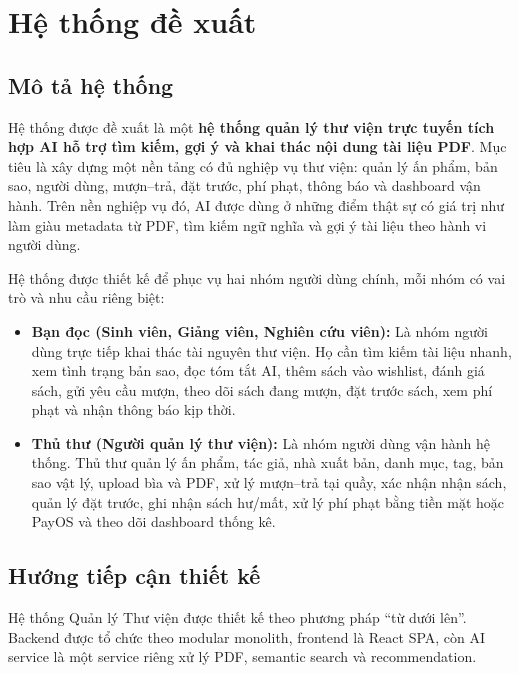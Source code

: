 \chapter{Hệ thống đề xuất}
\label{chap:HeThongDeXuat}

\section{Mô tả hệ thống}
\label{sec:MoTaHeThong}

Hệ thống được đề xuất là một \textbf{hệ thống quản lý thư viện trực tuyến tích hợp AI hỗ trợ tìm kiếm, gợi ý và khai thác nội dung tài liệu PDF}. Mục tiêu là xây dựng một nền tảng có đủ nghiệp vụ thư viện: quản lý ấn phẩm, bản sao, người dùng, mượn--trả, đặt trước, phí phạt, thông báo và dashboard vận hành. Trên nền nghiệp vụ đó, AI được dùng ở những điểm thật sự có giá trị như làm giàu metadata từ PDF, tìm kiếm ngữ nghĩa và gợi ý tài liệu theo hành vi người dùng.

Hệ thống được thiết kế để phục vụ hai nhóm người dùng chính, mỗi nhóm có vai trò và nhu cầu riêng biệt:
\begin{itemize}
    \item \textbf{Bạn đọc (Sinh viên, Giảng viên, Nghiên cứu viên):} Là nhóm người dùng trực tiếp khai thác tài nguyên thư viện. Họ cần tìm kiếm tài liệu nhanh, xem tình trạng bản sao, đọc tóm tắt AI, thêm sách vào wishlist, đánh giá sách, gửi yêu cầu mượn, theo dõi sách đang mượn, đặt trước sách, xem phí phạt và nhận thông báo kịp thời.

    \item \textbf{Thủ thư (Người quản lý thư viện):} Là nhóm người dùng vận hành hệ thống. Thủ thư quản lý ấn phẩm, tác giả, nhà xuất bản, danh mục, tag, bản sao vật lý, upload bìa và PDF, xử lý mượn--trả tại quầy, xác nhận nhận sách, quản lý đặt trước, ghi nhận sách hư/mất, xử lý phí phạt bằng tiền mặt hoặc PayOS và theo dõi dashboard thống kê.
\end{itemize}

\section{Hướng tiếp cận thiết kế}
\label{subsec:DesignApproach}

Hệ thống Quản lý Thư viện được thiết kế theo phương pháp ``từ dưới lên''. Backend được tổ chức theo modular monolith, frontend là React SPA, còn AI service là một service riêng xử lý PDF, semantic search và recommendation.

